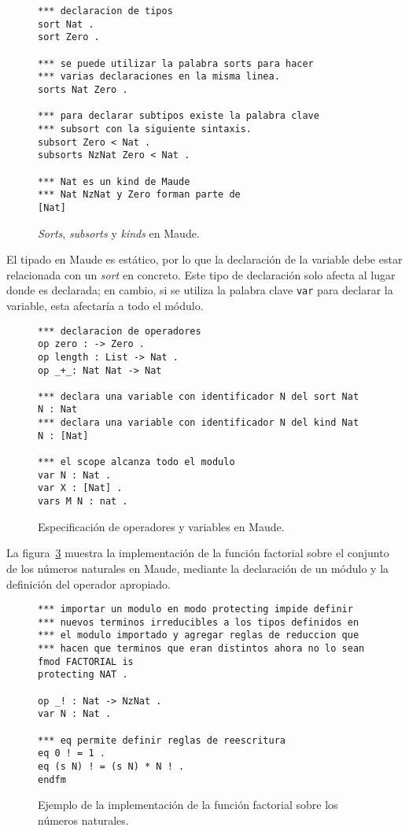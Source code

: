 \documentclass[11pt,captions=nooneline,DIV=14, parskip=full]{scrartcl}
\begin{document}
\begin{figure}[!htbp]
\begin{lstlisting}[frame=single]
*** declaracion de tipos
sort Nat .
sort Zero .

*** se puede utilizar la palabra sorts para hacer
*** varias declaraciones en la misma linea.
sorts Nat Zero .

*** para declarar subtipos existe la palabra clave
*** subsort con la siguiente sintaxis.
subsort Zero < Nat .
subsorts NzNat Zero < Nat .

*** Nat es un kind de Maude
*** Nat NzNat y Zero forman parte de
[Nat]
\end{lstlisting} 
\caption{\textit{Sorts}, \textit{subsorts} y \textit{kinds} en Maude.}
\label{fig:maudesyntax}
\end{figure}

El tipado en Maude es estático, por lo que la declaración de la variable debe estar relacionada con un \textit{sort} en concreto. Este tipo de declaración solo afecta al lugar donde es declarada; en cambio, si se utiliza la palabra clave \texttt{var} para declarar la variable, esta afectaría a todo el módulo.

\begin{figure}[!htbp]
\begin{lstlisting}[frame=single]
*** declaracion de operadores
op zero : -> Zero .
op length : List -> Nat .
op _+_: Nat Nat -> Nat

*** declara una variable con identificador N del sort Nat
N : Nat
*** declara una variable con identificador N del kind Nat
N : [Nat]

*** el scope alcanza todo el modulo
var N : Nat .
var X : [Nat] .
vars M N : nat .
\end{lstlisting} 
\caption{Especificación de operadores y variables en Maude.}
\label{fig:maudesyntax2}
\end{figure}

La figura~\ref{fig:maudefact} muestra la implementación de la función factorial sobre el conjunto de los números naturales en Maude, mediante la declaración de un módulo y la definición del operador apropiado.

\begin{figure}[!htbp]
\begin{lstlisting}[frame=single]
*** importar un modulo en modo protecting impide definir
*** nuevos terminos irreducibles a los tipos definidos en
*** el modulo importado y agregar reglas de reduccion que
*** hacen que terminos que eran distintos ahora no lo sean
fmod FACTORIAL is 
protecting NAT .

op _! : Nat -> NzNat .
var N : Nat .

*** eq permite definir reglas de reescritura
eq 0 ! = 1 .
eq (s N) ! = (s N) * N ! .
endfm
\end{lstlisting} 
\caption{Ejemplo de la implementación de la función factorial sobre los números naturales.}
\label{fig:maudefact}
\end{figure}
\end{document}
